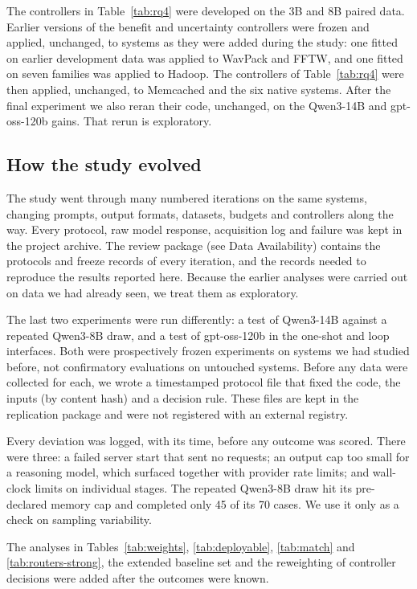 The controllers in Table~\ref{tab:rq4} were developed on the 3B and 8B paired data. Earlier versions of the benefit and uncertainty controllers were frozen and applied, unchanged, to systems as they were added during the study: one fitted on earlier development data was applied to WavPack and FFTW, and one fitted on seven families was applied to Hadoop. The controllers of Table~\ref{tab:rq4} were then applied, unchanged, to Memcached and the six native systems. After the final experiment we also reran their code, unchanged, on the Qwen3-14B and gpt-oss-120b gains. That rerun is exploratory.

\subsection{How the study evolved}
\label{sec:history}

The study went through many numbered iterations on the same systems, changing prompts, output formats, datasets, budgets and controllers along the way. Every protocol, raw model response, acquisition log and failure was kept in the project archive. The review package (see Data Availability) contains the protocols and freeze records of every iteration, and the records needed to reproduce the results reported here. Because the earlier analyses were carried out on data we had already seen, we treat them as exploratory.

The last two experiments were run differently: a test of Qwen3-14B against a repeated Qwen3-8B draw, and a test of gpt-oss-120b in the one-shot and loop interfaces. Both were prospectively frozen experiments on systems we had studied before, not confirmatory evaluations on untouched systems. Before any data were collected for each, we wrote a timestamped protocol file that fixed the code, the inputs (by content hash) and a decision rule. These files are kept in the replication package and were not registered with an external registry.

Every deviation was logged, with its time, before any outcome was scored. There were three: a failed server start that sent no requests; an output cap too small for a reasoning model, which surfaced together with provider rate limits; and wall-clock limits on individual stages. The repeated Qwen3-8B draw hit its pre-declared memory cap and completed only 45 of its 70 cases. We use it only as a check on sampling variability.

The analyses in Tables~\ref{tab:weights}, \ref{tab:deployable}, \ref{tab:match} and \ref{tab:routers-strong}, the extended baseline set and the reweighting of controller decisions were added after the outcomes were known.

